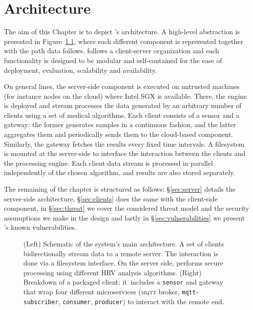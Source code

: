 \chapter{Architecture} \label{chap:architecture}

The aim of this Chapter is to depict \projName's architecture.
A high-level abstraction is presented in Figure~\ref{fig:system-architecture}, where each different component is represented together with the path data follows.
\projName follows a client-server organization and each functionality is designed to be modular and self-contained for the ease of deployment, evaluation, scalability and availability.

On general lines, the server-side component is executed on untrusted machines (for instance nodes on the cloud) where Intel SGX is available.
There, the \sgxspark engine is deployed and stream processes the data generated by an arbitrary number of clients using a set of medical algorithms.
Each client consists of a sensor and a gateway: the former generates samples in a continuous fashion, and the latter aggregates them and periodically sends them to the cloud-based component.
Similarly, the gateway fetches the results every fixed time intervals.
A filesystem is mounted at the server-side to interface the interaction between the clients and the processing engine.
Each client data stream is processed in parallel independently of the chosen algorithm, and results are also stored separately.

The remaining of the chapter is structured as follows: \S\ref{sec:server} details the server-side architecture, \S\ref{sec:clients} does the same with the client-side component, in \S\ref{sec:threat} we cover the considered threat model and the security assumptions we make in the design and lastly in \S\ref{sec:vulnerabilities} we present \projName's known vulnerabilities.

\begin{figure}[h!]
    \centering
    
    \caption{(Left) Schematic of the system's main architecture. A set of clients bidirectionally stream data to a remote server. The interaction is done via a filesystem interface. On the server side, \sgxspark performs secure processing using different HRV analysis algorithms. (Right) Breakdown of a packaged client: it includes a \texttt{sensor} and gateway that wrap four different microservices (\textsc{mqtt} broker, \texttt{mqtt-subscriber}, \texttt{consumer}, \texttt{producer}) to interact with the remote end. \label{fig:system-architecture}}
\end{figure}

